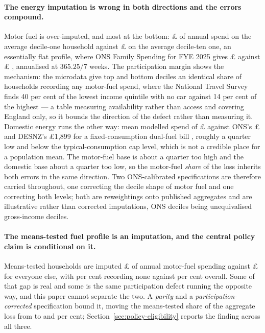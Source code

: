 \paragraph{The energy imputation is wrong in both directions and the errors compound.} Motor fuel is over-imputed, and most at the bottom: \pounds \genFuelSpendDecileOneRawGbp{} of annual spend on the average decile-one household against \pounds \genFuelSpendDecileTenRawGbp{} on the average decile-ten one, an essentially flat profile, where ONS Family Spending for FYE 2025 gives \pounds \genOnsBenchFuelDecileOneGbp{} against \pounds \genOnsBenchFuelDecileTenGbp{} \citep{ons2026familyspending}, annualised at $365.25/7$ weeks. The participation margin shows the mechanism: the microdata give top and bottom deciles an identical share of households recording any motor-fuel spend, where the National Travel Survey finds 40 per cent of the lowest income quintile with no car against 14 per cent of the highest \citep{dft2025nts} --- a table measuring availability rather than access and covering England only, so it bounds the direction of the defect rather than measuring it. Domestic energy runs the other way: mean modelled spend of \pounds \genModelDomesticMeanGbp{} against ONS's \pounds \genOnsBenchDomesticMeanGbp{} and DESNZ's \pounds 1{,}899 for a fixed-consumption dual-fuel bill \citep{desnz2026qep}, roughly a quarter low and below the typical-consumption cap level, which is not a credible place for a population mean. The motor-fuel base is about a quarter too high and the domestic base about a quarter too low, so the motor-fuel \emph{share} of the loss inherits both errors in the same direction. Two ONS-calibrated specifications are therefore carried throughout, one correcting the decile shape of motor fuel and one correcting both levels; both are reweightings onto published aggregates and are illustrative rather than corrected imputations, ONS deciles being unequivalised gross-income deciles.

\paragraph{The means-tested fuel profile is an imputation, and the central policy claim is conditional on it.} Means-tested households are imputed \pounds \genMeansTestedFuelSpendRawGbp{} of annual motor-fuel spending against \pounds \genNonMeansTestedFuelSpendRawGbp{} for everyone else, with \genZeroFuelShareMeansTestedRawPct{} per cent recording none against \genZeroFuelShareOverallRawPct{} per cent overall. Some of that gap is real and some is the same participation defect running the opposite way, and this paper cannot separate the two. A \emph{parity} and a \emph{participation-corrected} specification bound it, moving the means-tested share of the aggregate loss from \genMeansTestedShareOfLossPct{} to \genMeansTestedShareOfLossParityPct{} and \genMeansTestedShareOfLossParticipationPct{} per cent; Section~\ref{sec:policy-eligibility} reports the finding across all three.

